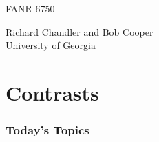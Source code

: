 \documentclass[color=usenames,dvipsnames]{beamer}\usepackage[]{graphicx}\usepackage[]{color}
\begin{document}

\begin{frame}[plain]
  \LARGE
  \centering \par
  {\bf \color{RoyalBlue}{Lab 4 -- Contrasts, Estimation, and Power Analysis \par}}
  \vspace{1cm}
  \Large
  FANR 6750 \par
  \vfill
  \large
  Richard Chandler and Bob Cooper \\
  University of Georgia \\
\end{frame}





\section{Contrasts}


\begin{frame}[plain]
  \frametitle{Today's Topics}
  \Large
\end{frame}
\end{document}
